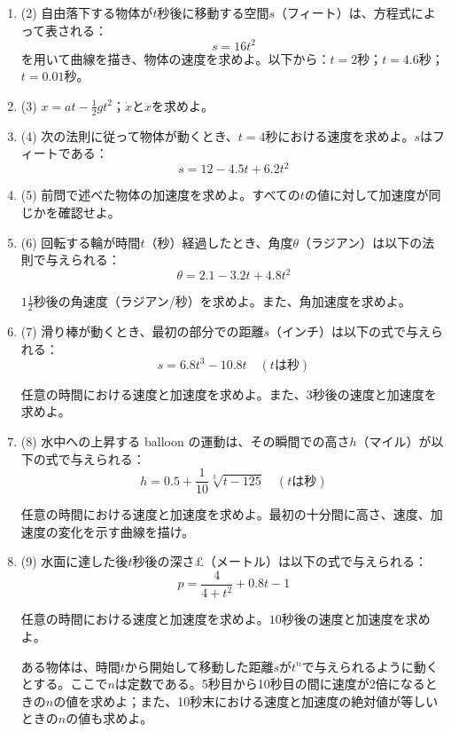 \documentclass[a4paper,11pt,openany]{ltjsbook}
\begin{document}
\begin{enumerate}
\item{(2)} 自由落下する物体が$t$秒後に移動する空間$s$（フィート）は、方程式によって表される：
\[
 s = 16t^2 
\]
を用いて曲線を描き、物体の速度を求めよ。以下から：$t = 2$秒；$t = 4.6$秒；$t = 0.01$秒。

\item{(3)} $x = at - \frac{1}{2}gt^2$；$\dot{x}$と$\ddot{x}$を求めよ。

\item{(4)} 次の法則に従って物体が動くとき、$t = 4$秒における速度を求めよ。$s$はフィートである：
\[
 s = 12 - 4.5t + 6.2t^2 
\]

\item{(5)} 前問で述べた物体の加速度を求めよ。すべての$t$の値に対して加速度が同じかを確認せよ。

\item{(6)} 回転する輪が時間$t$（秒）経過したとき、角度$\theta$（ラジアン）は以下の法則で与えられる：
\[
 \theta = 2.1 - 3.2t + 4.8t^2 
\]

$1\frac{1}{2}$秒後の角速度（ラジアン/秒）を求めよ。また、角加速度を求めよ。

\item{(7)} 滑り棒が動くとき、最初の部分での距離$s$（インチ）は以下の式で与えられる：
\[
 s = 6.8t^3 - 10.8t \quad (t \text{は秒}) 
\]

任意の時間における速度と加速度を求めよ。また、$3$秒後の速度と加速度を求めよ。

\item{(8)} 水中への上昇する balloon の運動は、その瞬間での高さ$h$（マイル）が以下の式で与えられる：
\[
 h = 0.5 + \frac{1}{10}\sqrt[3]{t-125} \quad (t \text{は秒}) 
\]

任意の時間における速度と加速度を求めよ。最初の十分間に高さ、速度、加速度の変化を示す曲線を描け。

\item{(9)} 水面に達した後$t$秒後の深さ£（メートル）は以下の式で与えられる：
\[
 p = \frac{4}{4+t^2} + 0.8t - 1 
\]

任意の時間における速度と加速度を求めよ。$10$秒後の速度と加速度を求めよ。

ある物体は、時間$t$から開始して移動した距離$s$が$t^n$で与えられるように動くとする。ここで$n$は定数である。5秒目から10秒目の間に速度が2倍になるときの$n$の値を求めよ；また、10秒末における速度と加速度の絶対値が等しいときの$n$の値も求めよ。
\end{enumerate}
\end{document}
